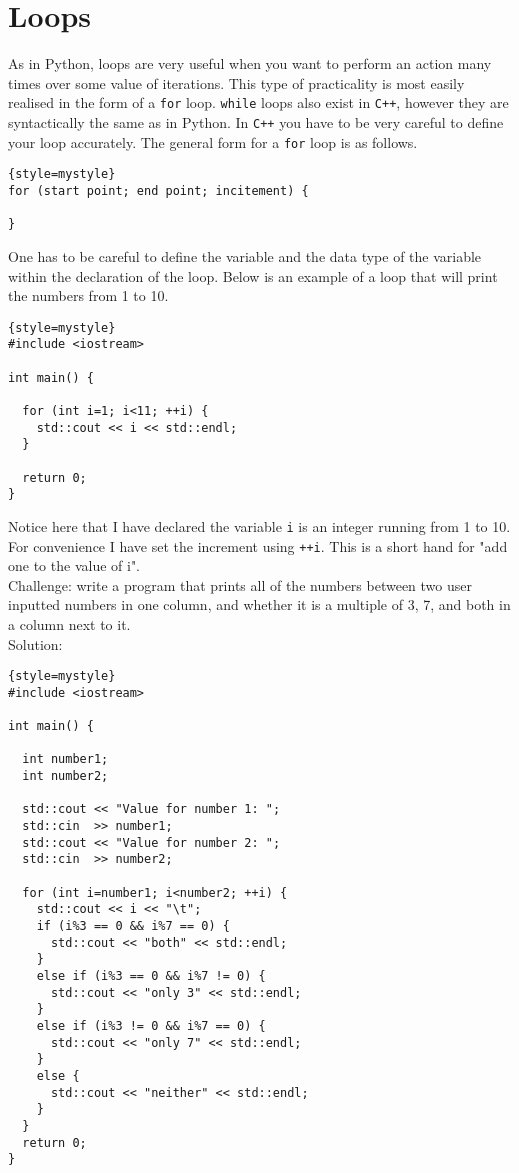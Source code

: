 \section{Loops}
As in Python, loops are very useful when you want to perform an action many times over some value of iterations.
This type of practicality is most easily realised in the form of a \texttt{for} loop. 
\texttt{while} loops also exist in \texttt{C++}, however they are syntactically the same as in Python.
In \texttt{C++} you have to be very careful to define your loop accurately.
The general form for a \texttt{for} loop is as follows.
\begin{lstlisting}{style=mystyle}
for (start point; end point; incitement) {

}
\end{lstlisting}
One has to be careful to define the variable and the data type of the variable within the declaration of the loop.
Below is an example of a loop that will print the numbers from 1 to 10.
\begin{lstlisting}{style=mystyle}
#include <iostream>

int main() {
  
  for (int i=1; i<11; ++i) {
    std::cout << i << std::endl;
  }
  
  return 0;
}
\end{lstlisting}
Notice here that I have declared the variable \texttt{i} is an integer running from 1 to 10.
For convenience I have set the increment using \texttt{++i}.
This is a short hand for "add one to the value of i".
\\
\noindent Challenge: write a program that prints all of the numbers between two user inputted numbers in one column, and whether it is a multiple of 3, 7, and both in a column next to it.
\\
\noindent Solution:
\begin{lstlisting}{style=mystyle}
#include <iostream>

int main() {
  
  int number1;
  int number2;
  
  std::cout << "Value for number 1: ";
  std::cin  >> number1;
  std::cout << "Value for number 2: ";
  std::cin  >> number2;
  
  for (int i=number1; i<number2; ++i) {
    std::cout << i << "\t";
    if (i%3 == 0 && i%7 == 0) {
      std::cout << "both" << std::endl;
    }
    else if (i%3 == 0 && i%7 != 0) {
      std::cout << "only 3" << std::endl;
    }
    else if (i%3 != 0 && i%7 == 0) {
      std::cout << "only 7" << std::endl;
    }
    else {
      std::cout << "neither" << std::endl;
    }
  }
  return 0;
}
\end{lstlisting}

